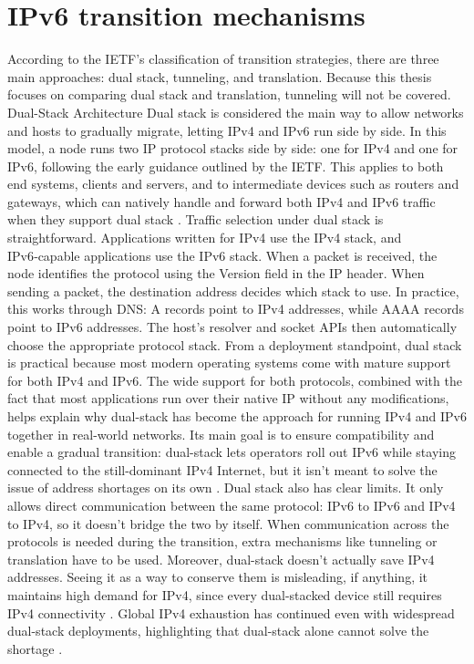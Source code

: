 \section{IPv6 transition mechanisms}
According to the IETF’s classification of transition strategies, there are three main approaches: dual stack, tunneling, and translation\cite{rfc2893}. Because this thesis focuses on comparing dual stack and translation, tunneling will not be covered. 
Dual-Stack Architecture
Dual stack is considered the main way to allow networks and hosts to gradually migrate, letting IPv4 and IPv6 run side by side\cite{punithavathani2009ipv4}. In this model, a node runs two IP protocol stacks side by side: one for IPv4 and one for IPv6, following the early guidance outlined by the IETF\cite{rfc2893}. This applies to both end systems, clients and servers, and to intermediate devices such as routers and gateways, which can natively handle and forward both IPv4 and IPv6 traffic when they support dual stack \cite{punithavathani2009ipv4}.
Traffic selection under dual stack is straightforward. Applications written for IPv4 use the IPv4 stack, and IPv6‑capable applications use the IPv6 stack. When a packet is received, the node identifies the protocol using the Version field in the IP header. When sending a packet, the destination address decides which stack to use\cite{rfc4213}. In practice, this works through DNS: A records point to IPv4 addresses, while AAAA records point to IPv6 addresses. The host’s resolver and socket APIs then automatically choose the appropriate protocol stack\cite{punithavathani2009ipv4}.
From a deployment standpoint, dual stack is practical because most modern operating systems come with mature support for both IPv4 and IPv6\cite{rfc7381}. The wide support for both protocols, combined with the fact that most applications run over their native IP without any modifications, helps explain why dual-stack has become the approach for running IPv4 and IPv6 together in real-world networks\cite{punithavathani2009ipv4}. Its main goal is to ensure compatibility and enable a gradual transition: dual-stack lets operators roll out IPv6 while staying connected to the still-dominant IPv4 Internet, but it isn’t meant to solve the issue of address shortages on its own \cite{LEVIN20141059}.
Dual stack also has clear limits. It only allows direct communication between the same protocol: IPv6 to IPv6 and IPv4 to IPv4, so it doesn't bridge the two by itself. When communication across the protocols is needed during the transition, extra mechanisms like tunneling or translation have to be used\cite{punithavathani2009ipv4}. Moreover, dual-stack doesn’t actually save IPv4 addresses. Seeing it as a way to conserve them is misleading, if anything, it maintains high demand for IPv4, since every dual-stacked device still requires IPv4 connectivity\cite{rfc4241} . Global IPv4 exhaustion has continued even with widespread dual-stack deployments, highlighting that dual-stack alone cannot solve the shortage \cite{LEVIN20141059}.
